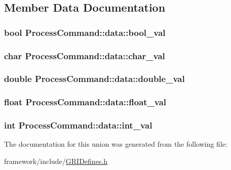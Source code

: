 \subsection{\-Member \-Data \-Documentation}
\hypertarget{unionProcessCommand_1_1data_a7c0c7bccecc8e9b97293f27883ffab98}{
\subsubsection[{bool\-\_\-val}]{\setlength{\rightskip}{0pt plus 5cm}bool {\bf \-Process\-Command\-::data\-::bool\-\_\-val}}}\label{unionProcessCommand_1_1data_a7c0c7bccecc8e9b97293f27883ffab98}
\hypertarget{unionProcessCommand_1_1data_ab3a6b574647d15f9e01f62ffcfd3f578}{
\subsubsection[{char\-\_\-val}]{\setlength{\rightskip}{0pt plus 5cm}char {\bf \-Process\-Command\-::data\-::char\-\_\-val}}}\label{unionProcessCommand_1_1data_ab3a6b574647d15f9e01f62ffcfd3f578}
\hypertarget{unionProcessCommand_1_1data_a69fc7fb2e0672163d4d323d2dab1deb9}{
\subsubsection[{double\-\_\-val}]{\setlength{\rightskip}{0pt plus 5cm}double {\bf \-Process\-Command\-::data\-::double\-\_\-val}}}\label{unionProcessCommand_1_1data_a69fc7fb2e0672163d4d323d2dab1deb9}
\hypertarget{unionProcessCommand_1_1data_aa06b1090af8e5e0c6ae8e41d3e546974}{
\subsubsection[{float\-\_\-val}]{\setlength{\rightskip}{0pt plus 5cm}float {\bf \-Process\-Command\-::data\-::float\-\_\-val}}}\label{unionProcessCommand_1_1data_aa06b1090af8e5e0c6ae8e41d3e546974}
\hypertarget{unionProcessCommand_1_1data_a601882d42e776e5072dacf0fd41bbce5}{
\subsubsection[{int\-\_\-val}]{\setlength{\rightskip}{0pt plus 5cm}int {\bf \-Process\-Command\-::data\-::int\-\_\-val}}}\label{unionProcessCommand_1_1data_a601882d42e776e5072dacf0fd41bbce5}


\-The documentation for this union was generated from the following file\-:\begin{DoxyCompactItemize}
\item 
framework/include/\hyperlink{GRIDefines_8h}{\-G\-R\-I\-Defines.\-h}\end{DoxyCompactItemize}
